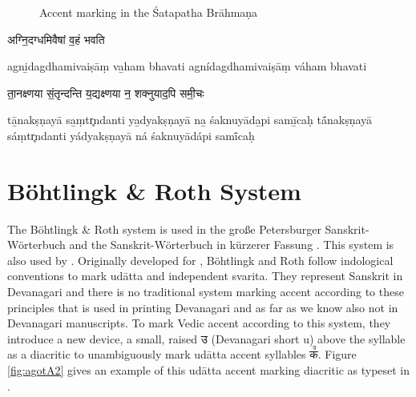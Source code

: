 \begin{figure}[!ht]
\begin{center}
\end{center}
\caption[Accent marking in the Śatapatha Brāhmaṇa]{\label{fig:SBr-3-5-4-13}Accent marking in the Śatapatha Brāhmaṇa}
\end{figure}

\begin{exe}
\ex
\begin{xlist}
\ex \begin{devfont}अग्नि॒दग्धमिवैषां व॒हं भवति\end{devfont}
\ex agni̲dagdhamivaiṣāṃ va̲ham bhavati
\ex agnídagdhamivaiṣāṃ váham bhavati
\end{xlist}
\end{exe}

\begin{exe}
\ex
\begin{xlist}
\ex \begin{devfont}ता॒नक्ष्णया सं॒तृन्दन्ति य॒द्यक्ष्णया न॒ शक्नुयाद॒पि समी॒चः\end{devfont}
\ex tā̲nakṣṇayā sa̲ṃtr̥ndanti ya̲dyakṣṇayā na̲ śaknuyāda̲pi samī̲caḥ
\ex tā́nakṣṇayā sáṃtr̥ndanti yádyakṣṇayā ná śaknuyādápi samī́caḥ
\end{xlist}
\end{exe}

\section{Böhtlingk \& Roth System}

The Böhtlingk \& Roth system is used in the große Petersburger Sanskrit-Wörterbuch \citep{pwg} and the Sanskrit-Wörterbuch in kürzerer Fassung \citep{pw}. This system is also used by \citet{Whitney1889}. Originally developed for \citet{pwg}, Böhtlingk and Roth follow indological conventions to mark udātta and independent svarita. They represent Sanskrit in Devanagari and there is no traditional system marking accent according to these principles that is used in printing Devanagari and as far as we know also not in Devanagari manuscripts. To mark Vedic accent according to this system, they introduce a new device, a small, raised {\devfont उ} (Devanagari short u) above the syllable as a diacritic to unambiguously mark udātta accent syllables {\devfont क꣫}. Figure \ref{fig:agotA2} gives an example of this udātta accent marking diacritic as typeset in \citet{pwg}.

